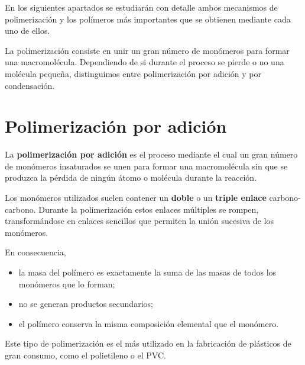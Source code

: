En los siguientes apartados se estudiarán con detalle ambos mecanismos de
polimerización y los polímeros más importantes que se obtienen mediante cada uno de
ellos.


\begin{tcolorbox}[
title=Recuerda,
colback=blue!5,
colframe=blue!70!black]

La polimerización consiste en unir un gran número de monómeros para formar una
macromolécula. Dependiendo de si durante el proceso se pierde o no una molécula
pequeña, distinguimos entre polimerización por adición y por condensación.

\end{tcolorbox}


\section{Polimerización por adición}

La \textbf{polimerización por adición} es el proceso mediante el cual un gran número
de monómeros insaturados se unen para formar una macromolécula sin que se produzca la
pérdida de ningún átomo o molécula durante la reacción.

Los monómeros utilizados suelen contener un \textbf{doble} o un \textbf{triple enlace}
carbono-carbono. Durante la polimerización estos enlaces múltiples se rompen,
transformándose en enlaces sencillos que permiten la unión sucesiva de los monómeros.

En consecuencia,

\begin{itemize}
\item la masa del polímero es exactamente la suma de las masas de todos los
monómeros que lo forman;
\item no se generan productos secundarios;
\item el polímero conserva la misma composición elemental que el monómero.
\end{itemize}

Este tipo de polimerización es el más utilizado en la fabricación de plásticos de
gran consumo, como el polietileno o el PVC.

